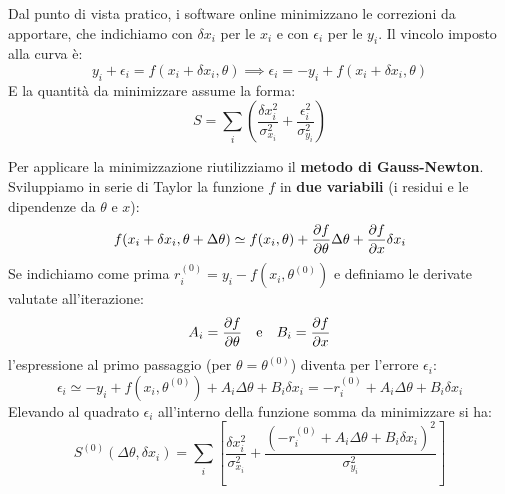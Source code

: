 \documentclass[openany,a4paper,12pt]{book}
\theoremstyle{remark}
\begin{document}
Dal punto di vista pratico, i software online minimizzano le correzioni da apportare, che indichiamo con $\delta x_i$ per le $x_i$ e con $\epsilon_i$ per le $y_i$. Il vincolo imposto alla curva è:
\begin{equation*}
    y_i + \epsilon_i = f(x_i + \delta x_i, \theta) \implies \epsilon_i = -y_i + f(x_i + \delta x_i, \theta)
\end{equation*}
E la quantità da minimizzare assume la forma:
\begin{equation}
    S = \sum_{i} \left( \frac{\delta x_i^2}{\sigma_{x_i}^2} + \frac{\epsilon_i^2}{\sigma_{y_i}^2} \right)
\end{equation}

Per applicare la minimizzazione riutilizziamo il \textbf{metodo di Gauss-Newton}. Sviluppiamo in serie di Taylor la funzione $f$ in \textbf{due variabili} (i residui e le dipendenze da $\theta$ e $x$):
\begin{equation*}
    f(x_i + \delta x_i, \theta + \Delta\theta) \simeq f(x_i, \theta) + \pderivative{f}{\theta}\Delta\theta + \pderivative{f}{x}\delta x_i
\end{equation*}
Se indichiamo come prima $r_i^{(0)} = y_i - f(x_i, \theta^{(0)})$ e definiamo le derivate valutate all'iterazione:
\begin{equation*}
    A_i = \pderivative{f}{\theta} \quad \text{e} \quad B_i = \pderivative{f}{x}
\end{equation*}
l'espressione al primo passaggio (per $\theta = \theta^{(0)}$) diventa per l'errore $\epsilon_i$:
\begin{equation*}
    \epsilon_i \simeq -y_i + f(x_i, \theta^{(0)}) + A_i \Delta\theta + B_i \delta x_i = -r_i^{(0)} + A_i \Delta\theta + B_i \delta x_i
\end{equation*}
Elevando al quadrato $\epsilon_i$ all'interno della funzione somma da minimizzare si ha:
\begin{equation}
    S^{(0)}(\Delta\theta, \delta x_i) = \sum_{i} \left[ \frac{\delta x_i^2}{\sigma_{x_i}^2} + \frac{(-r_i^{(0)} + A_i \Delta\theta + B_i \delta x_i)^2}{\sigma_{y_i}^2} \right]
\end{equation}
\end{document}
